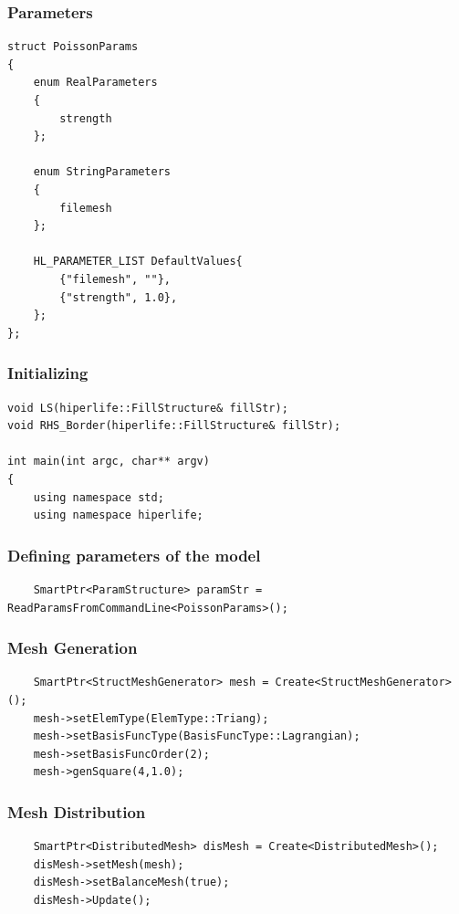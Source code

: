\documentclass[]{article}
\begin{document}
\subsubsection{Parameters} \label{sec: ppr}
\begin{lstlisting}
struct PoissonParams
{
	enum RealParameters
	{
		strength
	};
	
	enum StringParameters
	{
		filemesh
	};
	
	HL_PARAMETER_LIST DefaultValues{
		{"filemesh", ""},
		{"strength", 1.0},
	};
};
\end{lstlisting}

\subsubsection{Initializing} \label{sec: main}
\begin{lstlisting}
void LS(hiperlife::FillStructure& fillStr);
void RHS_Border(hiperlife::FillStructure& fillStr);

int main(int argc, char** argv)
{
	using namespace std;
	using namespace hiperlife;
\end{lstlisting}

\subsubsection{Defining parameters of the model} \label{sec: Pstr}
\begin{lstlisting}
	SmartPtr<ParamStructure> paramStr = ReadParamsFromCommandLine<PoissonParams>();
\end{lstlisting}

\subsubsection{Mesh Generation} \label{sec: mshG}
\begin{lstlisting}
	SmartPtr<StructMeshGenerator> mesh = Create<StructMeshGenerator>();
	mesh->setElemType(ElemType::Triang);
	mesh->setBasisFuncType(BasisFuncType::Lagrangian);
	mesh->setBasisFuncOrder(2);
	mesh->genSquare(4,1.0);
\end{lstlisting}

\subsubsection{Mesh Distribution} \label{sec: mshD}
\begin{lstlisting}
	SmartPtr<DistributedMesh> disMesh = Create<DistributedMesh>();
	disMesh->setMesh(mesh);
	disMesh->setBalanceMesh(true);
	disMesh->Update();
\end{lstlisting}
\end{document}
